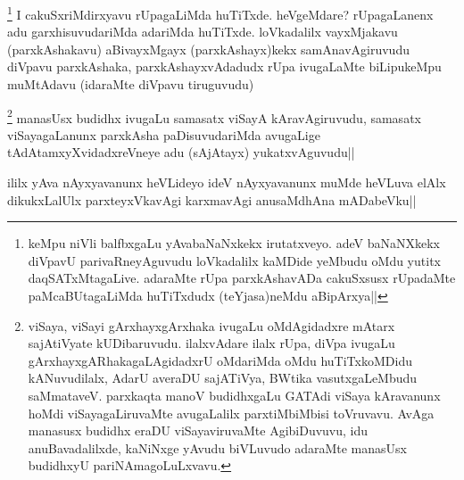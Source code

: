 \begin{artha}
\footnote[1]{keMpu niVli balfbxgaLu yAvabaNaNxkekx irutatxveyo. adeV baNaNXkekx diVpavU parivaRneyAguvudu loVkadalilx kaMDide yeMbudu oMdu yutitx daqSATxMtagaLive. adaraMte rUpa parxkAshavADa cakuSxsusx rUpadaMte paMcaBUtagaLiMda huTiTxdudx (teYjasa)neMdu aBipArxya||} I cakuSxriMdirxyavu rUpagaLiMda huTiTxde. heVgeMdare? rUpagaLanenx adu garxhisuvudariMda adariMda huTiTxde. loVkadalilx vayxMjakavu (parxkAshakavu) aBivayxMgayx (parxkAshayx)kekx samAnavAgiruvudu diVpavu parxkAshaka, parxkAshayxvAdadudx rUpa ivugaLaMte biLipukeMpu muMtAdavu (idaraMte diVpavu tiruguvudu)
\end{artha}


\begin{artha}
\footnote[1]{viSaya, viSayi gArxhayxgArxhaka ivugaLu oMdAgidadxre mAtarx sajAtiVyate kUDibaruvudu. ilalxvAdare ilalx rUpa, diVpa ivugaLu gArxhayxgARhakagaLAgidadxrU oMdariMda oMdu huTiTxkoMDidu kANuvudilalx, AdarU averaDU sajATiVya, BWtika vasutxgaLeMbudu saMmataveV. parxkaqta manoV budidhxgaLu GATAdi viSaya kAravanunx hoMdi viSayagaLiruvaMte avugaLalilx parxtiMbiMbisi toVruvavu. AvAga manasusx budidhx eraDU viSayaviruvaMte AgibiDuvuvu, idu anuBavadalilxde, kaNiNxge yAvudu biVLuvudo adaraMte manasUsx budidhxyU pariNAmagoLuLxvavu.} manasUsx budidhx ivugaLu samasatx viSayA kAravAgiruvudu, samasatx viSayagaLanunx parxkAsha paDisuvudariMda avugaLige tAdAtamxyXvidadxreVneye adu (sAjAtayx) yukatxvAguvudu||
\end{artha}


\begin{artha}
ililx yAva nAyxyavanunx heVLideyo ideV nAyxyavanunx muMde heVLuva elAlx dikukxLalUlx parxteyxVkavAgi karxmavAgi anusaMdhAna mADabeVku||
\end{artha}


